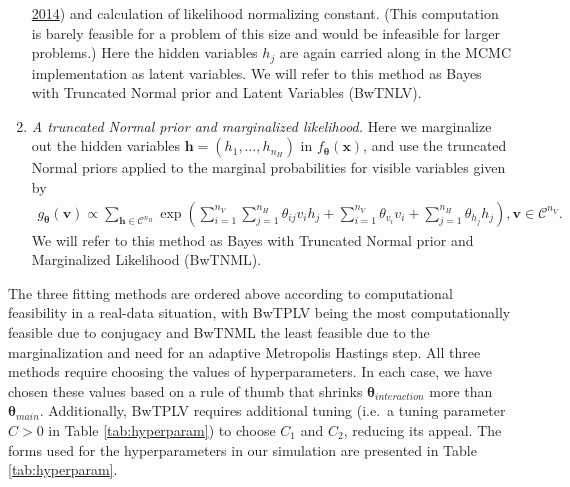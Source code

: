 \documentclass[12pt]{article}
\theoremstyle{definition}
\newcommand{\nv}{{n_{\scriptscriptstyle V}}}
\newcommand{\nh}{{n_{\scriptscriptstyle H}}}
\begin{document}
\begin{enumerate}
  \protect\hyperlink{ref-zhou2014some}{2014}) and calculation of
  likelihood normalizing constant. (This computation is barely feasible
  for a problem of this size and would be infeasible for larger
  problems.) Here the hidden variables \(h_j\) are again carried along
  in the MCMC implementation as latent variables. We will refer to this
  method as Bayes with Truncated Normal prior and Latent Variables
  (BwTNLV).
\item
  \emph{A truncated Normal prior and marginalized likelihood.} Here we
  marginalize out the hidden variables
  \(\boldsymbol h = (h_1, \dots, h_\nh)\) in
  \(f_{\boldsymbol \theta}(\boldsymbol x)\), and use the truncated
  Normal priors applied to the marginal probabilities for visible
  variables given by
  \begin{align*}
  g_{\boldsymbol \theta}(\boldsymbol v) \propto \sum\limits_{\boldsymbol h \in \mathcal{C}^\nh} \exp\left(\sum\limits_{i = 1}^\nv \sum\limits_{j=1}^\nh \theta_{ij} v_i h_j + \sum\limits_{i = 1}^\nv\theta_{v_i} v_i + \sum\limits_{j = 1}^\nh\theta_{h_j} h_j\right), \boldsymbol v \in \mathcal{C}^\nv.
  \end{align*}
  We will refer to this method as Bayes with Truncated Normal prior and
  Marginalized Likelihood (BwTNML).
\end{enumerate}
The three fitting methods are ordered above according to computational
feasibility in a real-data situation, with BwTPLV being the most
computationally feasible due to conjugacy and BwTNML the least feasible
due to the marginalization and need for an adaptive Metropolis Hastings
step. All three methods require choosing the values of hyperparameters.
In each case, we have chosen these values based on a rule of thumb that
shrinks \(\boldsymbol \theta_{interaction}\) more than
\(\boldsymbol \theta_{main}\). Additionally, BwTPLV requires additional
tuning (i.e.~a tuning parameter \(C > 0\) in Table \ref{tab:hyperparam})
to choose \(C_1\) and \(C_2\), reducing its appeal. The forms used for
the hyperparameters in our simulation are presented in Table
\ref{tab:hyperparam}.
\end{document}

